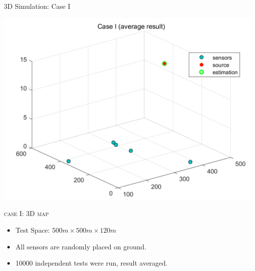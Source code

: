 \documentclass[10pt]{beamer}
\begin{document}
\begin{frame}{3D Simulation: Case I}
  \begin{center}
  \includegraphics[scale = 0.25]{img/case1result.png}
  \end{center}
  \begin{center} \textsc{case I: 3D map} \end{center}
  \begin{itemize}
    \item \small Test Space: $500m\times500m\times120m$
    \item \small All sensors are randomly placed on ground.
    \item \small 10000 independent tests were run, result averaged.
  \end{itemize}
\end{frame}
\end{document}
